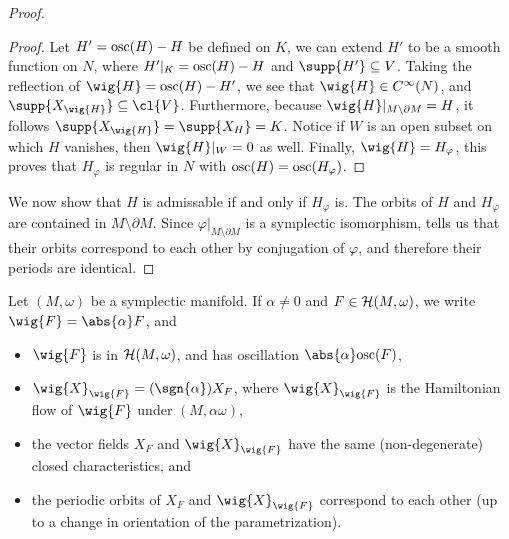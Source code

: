 \documentclass[../main-v2-manifolds.tex]{subfiles}
\begin{document}
\begin{proof}
\begin{note}
\begin{proof}
    Let $H' = \mathrm{osc}(H) - H$ be defined on $K$, we can extend $H'$ to be a smooth function on $N$, where $H'\vert_{K} = \mathrm{osc}(H)- H$ and $\supp{H'}\subseteq V$. Taking the reflection of $\wig{H} = \osc(H) - H'$, we see that $\wig{H}\in C^\infty(N)$, and $\supp{X_{\wig{H}}}\subseteq \cl{V}$. Furthermore, because $\wig{H}\vert_{M\setminus\partial M} = H$, it follows $\supp{X_{\wig{H}}} = \supp{X_H}=K$. Notice if $W$ is an open subset on which $H$ vanishes, then $\wig{H}\vert_W = 0$ as well. Finally, $\wig{H} = H_{\varphi}$, this proves that $H_{\varphi}$ is regular in $N$ with $\mathrm{osc}(H) = \mathrm{osc}(H_{\varphi})$.
    \end{proof}
\end{note}
We now show that $H$ is admissable if and only if $H_{\varphi}$ is. The orbits of $H$ and $H_{\varphi}$ are contained in $M\setminus\partial M$. Since $\varphi\vert_{M\setminus\partial M}$ is a symplectic isomorphism,  tells us that their orbits correspond to each other by conjugation of $\varphi$, and therefore their periods are identical.
\end{proof}
\begin{wts}\label{thm:conformality of frakco}
    Let $(M,\omega)$ be a symplectic manifold. If $\alpha\neq 0$ and $F\in\mathcal{H}(M,\omega)$, we write $\wig{F}=\abs{\alpha}F$, and
    \begin{itemize}
        \item $\wig{F}$ is in $\mathcal{H}(M,\omega)$, and has oscillation $\abs{\alpha}\osc(F)$,
        \item $\wig{X}_{\wig{F}} = (\sgn{\alpha})X_{F}$, where $\wig{X}_{\wig{F}}$ is the Hamiltonian flow of $\wig{F}$ under $(M,\alpha\omega)$, 
        \item the vector fields $X_{F}$ and $\wig{X}_{\wig{F}}$ have the same (non-degenerate) closed characteristics, and
        \item the periodic orbits of $X_{F}$ and $\wig{X}_{\wig{F}}$ correspond to each other (up to a change in orientation of the parametrization).
    \end{itemize}
\end{wts}
\end{document}
